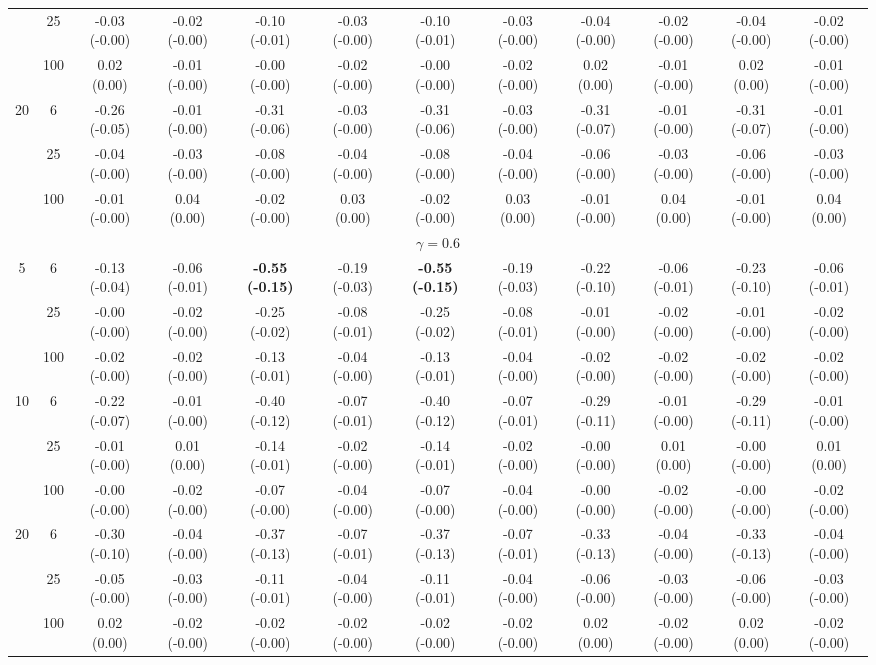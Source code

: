 \documentclass[
  man]{apa6}
\newenvironment{lltable}{\begin{landscape}\centering\begin{ThreePartTable}}{\end{ThreePartTable}\end{landscape}}
\begin{document}
\begin{lltable}
{\begin{longtable}{cccccccccccc}
 & 25 & -0.03 (-0.00) & -0.02 (-0.00) & -0.10 (-0.01) & -0.03 (-0.00) & -0.10 (-0.01) & -0.03 (-0.00) & -0.04 (-0.00) & -0.02 (-0.00) & -0.04 (-0.00) & -0.02 (-0.00)\\
 & 100 & 0.02 (0.00) & -0.01 (-0.00) & -0.00 (-0.00) & -0.02 (-0.00) & -0.00 (-0.00) & -0.02 (-0.00) & 0.02 (0.00) & -0.01 (-0.00) & 0.02 (0.00) & -0.01 (-0.00)\\
20 & 6 & -0.26 (-0.05) & -0.01 (-0.00) & -0.31 (-0.06) & -0.03 (-0.00) & -0.31 (-0.06) & -0.03 (-0.00) & -0.31 (-0.07) & -0.01 (-0.00) & -0.31 (-0.07) & -0.01 (-0.00)\\
 & 25 & -0.04 (-0.00) & -0.03 (-0.00) & -0.08 (-0.00) & -0.04 (-0.00) & -0.08 (-0.00) & -0.04 (-0.00) & -0.06 (-0.00) & -0.03 (-0.00) & -0.06 (-0.00) & -0.03 (-0.00)\\
 & 100 & -0.01 (-0.00) & 0.04 (0.00) & -0.02 (-0.00) & 0.03 (0.00) & -0.02 (-0.00) & 0.03 (0.00) & -0.01 (-0.00) & 0.04 (0.00) & -0.01 (-0.00) & 0.04 (0.00)\\
\multicolumn{12}{c}{$\gamma = 0.6$}\\
5 & 6 & -0.13 (-0.04) & -0.06 (-0.01) & \textbf{-0.55 (-0.15)} & -0.19 (-0.03) & \textbf{-0.55 (-0.15)} & -0.19 (-0.03) & -0.22 (-0.10) & -0.06 (-0.01) & -0.23 (-0.10) & -0.06 (-0.01)\\
 & 25 & -0.00 (-0.00) & -0.02 (-0.00) & -0.25 (-0.02) & -0.08 (-0.01) & -0.25 (-0.02) & -0.08 (-0.01) & -0.01 (-0.00) & -0.02 (-0.00) & -0.01 (-0.00) & -0.02 (-0.00)\\
 & 100 & -0.02 (-0.00) & -0.02 (-0.00) & -0.13 (-0.01) & -0.04 (-0.00) & -0.13 (-0.01) & -0.04 (-0.00) & -0.02 (-0.00) & -0.02 (-0.00) & -0.02 (-0.00) & -0.02 (-0.00)\\
10 & 6 & -0.22 (-0.07) & -0.01 (-0.00) & -0.40 (-0.12) & -0.07 (-0.01) & -0.40 (-0.12) & -0.07 (-0.01) & -0.29 (-0.11) & -0.01 (-0.00) & -0.29 (-0.11) & -0.01 (-0.00)\\
 & 25 & -0.01 (-0.00) & 0.01 (0.00) & -0.14 (-0.01) & -0.02 (-0.00) & -0.14 (-0.01) & -0.02 (-0.00) & -0.00 (-0.00) & 0.01 (0.00) & -0.00 (-0.00) & 0.01 (0.00)\\
 & 100 & -0.00 (-0.00) & -0.02 (-0.00) & -0.07 (-0.00) & -0.04 (-0.00) & -0.07 (-0.00) & -0.04 (-0.00) & -0.00 (-0.00) & -0.02 (-0.00) & -0.00 (-0.00) & -0.02 (-0.00)\\
20 & 6 & -0.30 (-0.10) & -0.04 (-0.00) & -0.37 (-0.13) & -0.07 (-0.01) & -0.37 (-0.13) & -0.07 (-0.01) & -0.33 (-0.13) & -0.04 (-0.00) & -0.33 (-0.13) & -0.04 (-0.00)\\
 & 25 & -0.05 (-0.00) & -0.03 (-0.00) & -0.11 (-0.01) & -0.04 (-0.00) & -0.11 (-0.01) & -0.04 (-0.00) & -0.06 (-0.00) & -0.03 (-0.00) & -0.06 (-0.00) & -0.03 (-0.00)\\
 & 100 & 0.02 (0.00) & -0.02 (-0.00) & -0.02 (-0.00) & -0.02 (-0.00) & -0.02 (-0.00) & -0.02 (-0.00) & 0.02 (0.00) & -0.02 (-0.00) & 0.02 (0.00) & -0.02 (-0.00)\\
\bottomrule
\end{longtable}

}

\end{lltable}
\end{document}
